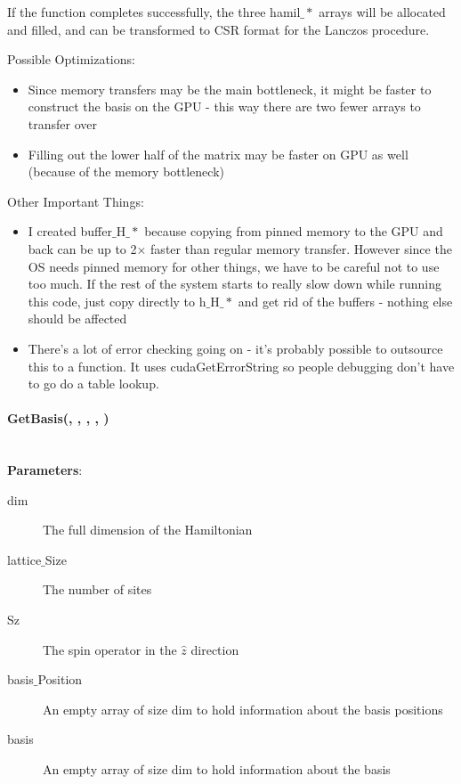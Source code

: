\documentclass{article}
\begin{document}
If the function completes successfully, the three hamil$\_*$ arrays will be allocated and filled, and can be transformed to CSR format for the Lanczos procedure.
 
Possible Optimizations:
\begin{itemize}
\item{Since memory transfers may be the main bottleneck, it might be faster to construct the basis on the GPU - this way there are two fewer arrays to transfer over}
\item{Filling out the lower half of the matrix may be faster on GPU as well (because of the memory bottleneck)}
\end{itemize}

Other Important Things:
\begin{itemize}
\item{I created buffer$\_$H$\_*$ because copying from pinned memory to the GPU and back can be up to 2$\times$ faster than regular memory transfer. However since the OS needs pinned memory for other things, we have to be careful not to use too much. If the rest of the system starts to really slow down while running this code, just copy directly to h$\_$H$\_*$ and get rid of the buffers - nothing else should be affected}
\item{ There's a lot of error checking going on - it's probably possible to outsource this to a function. It uses cudaGetErrorString so people debugging don't have to go do a table lookup.}
\end{itemize} 

\paragraph{\host \void GetBasis(\int , \int , \int , \long [], \long []) \\ \\}
\noindent\textbf{Parameters}:
\begin{description}
\item[\long dim] The full dimension of the Hamiltonian
\item[\int lattice$\_$Size] The number of sites
\item[\int Sz] The spin operator in the $\hat{z}$ direction
\item[\long basis$\_$Position] An empty array of size dim to hold information about the basis positions
\item[\long basis] An empty array of size dim to hold information about the basis
\end{description}
\end{document}

